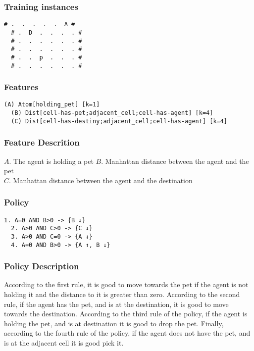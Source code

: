 \documentclass[a4paper]{article}
\begin{document}
\subsubsection{Training instances}
\begin{Verbatim}[fontsize=\footnotesize]
  # .  .  .  .  .  A #
  # .  D  .  .  .  . #
  # .  .  .  .  .  . #
  # .  .  .  .  .  . #
  # .  .  p  .  .  . #
  # .  .  .  .  .  . #
\end{Verbatim}

\subsubsection{Features}
\begin{Verbatim}[fontsize=\footnotesize]
  (A) Atom[holding_pet] [k=1]
  (B) Dist[cell-has-pet;adjacent_cell;cell-has-agent] [k=4]
  (C) Dist[cell-has-destiny;adjacent_cell;cell-has-agent] [k=4]
\end{Verbatim}

\subsubsection{Feature Descrition}
$A$. The agent is holding a pet
$B$. Manhattan distance between the agent and the pet\\
$C$. Manhattan distance between the agent and the destination

\subsubsection{Policy}
\begin{Verbatim}[fontsize=\footnotesize]
  1. A=0 AND B>0 -> {B ↓}
  2. A>0 AND C>0 -> {C ↓}
  3. A>0 AND C=0 -> {A ↓}
  4. A=0 AND B>0 -> {A ↑, B ↓}
\end{Verbatim}

\subsubsection{Policy Description}
According to the first rule, it is good to move towards the pet if the agent is not holding it and the distance to it is greater than zero. According to the second rule, if the agent has the pet, and is at the destination, it is good to move towards the destination. According to the third rule of the policy, if the agent is holding the pet, and is at destination it is good to drop the pet. Finally, according to the fourth rule of the policy, if the agent does not have the pet, and is at the adjacent cell it is good pick it.
\end{document}
